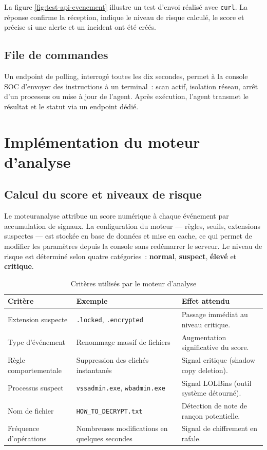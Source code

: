\noindent La figure \ref{fig:test-api-evenement} illustre un test d'envoi réalisé avec \texttt{curl}. La réponse confirme la réception, indique le niveau de risque calculé, le score et précise si une alerte et un incident ont été créés.

\subsection{File de commandes}

Un endpoint de polling, interrogé toutes les dix secondes, permet à la console SOC d'envoyer des instructions à un terminal~: scan actif, isolation réseau, arrêt d'un processus ou mise à jour de l'agent. Après exécution, l'agent transmet le résultat et le statut via un endpoint dédié.

\section{Implémentation du moteur d'analyse}

\subsection{Calcul du score et niveaux de risque}

Le \gls{moteuranalyse} attribue un score numérique à chaque événement par accumulation de signaux. La configuration du moteur --- règles, seuils, extensions suspectes --- est stockée en base de données et mise en cache, ce qui permet de modifier les paramètres depuis la console sans redémarrer le serveur. Le niveau de risque est déterminé selon quatre catégories~: \textbf{normal}, \textbf{suspect}, \textbf{élevé} et \textbf{critique}.

\begin{table}[htbp]
\centering
\caption{Critères utilisés par le moteur d'analyse}
\label{tab:criteres-analyse}
\small
\renewcommand{\arraystretch}{1.3}
\begin{tabularx}{\textwidth}{|p{3.6cm}|p{4.5cm}|X|}
\hline
\textbf{Critère} & \textbf{Exemple} & \textbf{Effet attendu} \\
\hline
Extension suspecte & \texttt{.locked}, \texttt{.encrypted} & Passage immédiat au niveau critique. \\
\hline
Type d'événement & Renommage massif de fichiers & Augmentation significative du score. \\
\hline
Règle comportementale & Suppression des clichés instantanés & Signal critique (shadow copy deletion). \\
\hline
Processus suspect & \texttt{vssadmin.exe}, \texttt{wbadmin.exe} & Signal LOLBins (outil système détourné). \\
\hline
Nom de fichier & \texttt{HOW\_TO\_DECRYPT.txt} & Détection de note de rançon potentielle. \\
\hline
Fréquence d'opérations & Nombreuses modifications en quelques secondes & Signal de chiffrement en rafale. \\
\hline
\end{tabularx}
\end{table}
\newpage
